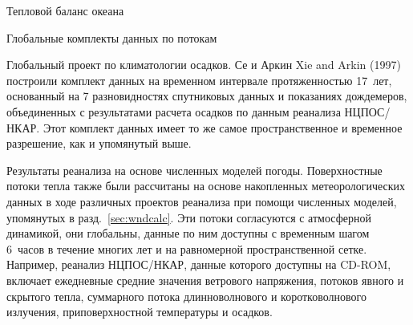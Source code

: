 \begin{chapter}{Тепловой баланс океана}
\begin{section}{Глобальные комплекты данных по потокам}
\begin{paragraph}{Глобальный проект по климатологии осадков.}
Се и Аркин Xie and Arkin (1997) построили комплект данных на временном 
интервале протяженностью 17~лет, основанный на 7 разновидностях спутниковых
данных и показаниях дождемеров, объединенных с результатами расчета осадков
по данным реанализа НЦПОС/НКАР. Этот комплект данных имеет то же самое
пространственное и временное разрешение, как и упомянутый выше.
%
\end{paragraph}

\begin{paragraph}{Результаты реанализа на основе численных моделей погоды.}
Поверхностные потоки тепла также были рассчитаны на основе накопленных 
метеорологических данных в ходе различных проектов реанализа при помощи 
численных моделей, упомянутых в разд.~\ref{sec:wndcalc}. Эти потоки согласуются
с атмосферной динамикой, они глобальны, данные по ним доступны с временным 
шагом 6~часов в течение многих лет и на равномерной пространственной сетке. 
Например, реанализ НЦПОС/НКАР, данные которого доступны на CD-ROM, включает
ежедневные средние значения ветрового напряжения, потоков явного и скрытого 
тепла, суммарного потока длинноволнового и коротковолнового излучения,
приповерхностной температуры и осадков.
%
\end{paragraph}


\end{section}
\end{chapter}
